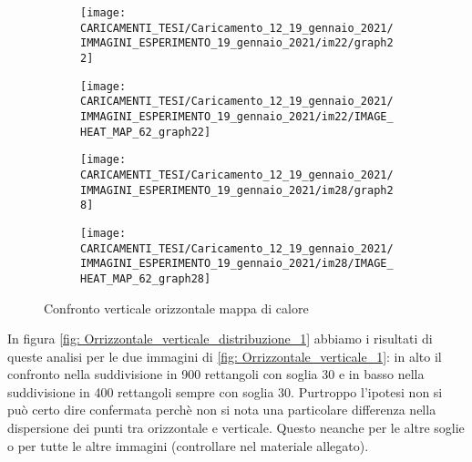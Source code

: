 \documentclass[%
	corpo=12pt,
    twoside,
    stile=classica,
    oldstyle,
    tipotesi=custom,
    greek,
    evenboxes,
]{toptesi}
\begin{document}
{%
%
%


\begin{figure}[!htb]\centering
\begin{subfigure}
\centering
\texttt{[image: CARICAMENTI\_TESI/Caricamento\_12\_19\_gennaio\_2021/IMMAGINI\_ESPERIMENTO\_19\_gennaio\_2021/im22/graph22]}
\end{subfigure}
\begin{subfigure}
\centering
\texttt{[image: CARICAMENTI\_TESI/Caricamento\_12\_19\_gennaio\_2021/IMMAGINI\_ESPERIMENTO\_19\_gennaio\_2021/im22/IMAGE\_HEAT\_MAP\_62\_graph22]}
\end{subfigure}
\begin{subfigure}
\centering
\texttt{[image: CARICAMENTI\_TESI/Caricamento\_12\_19\_gennaio\_2021/IMMAGINI\_ESPERIMENTO\_19\_gennaio\_2021/im28/graph28]}
\end{subfigure}
\begin{subfigure}
\centering
\texttt{[image: CARICAMENTI\_TESI/Caricamento\_12\_19\_gennaio\_2021/IMMAGINI\_ESPERIMENTO\_19\_gennaio\_2021/im28/IMAGE\_HEAT\_MAP\_62\_graph28]}
\end{subfigure}
\caption{Confronto verticale orizzontale mappa di calore}\label{fig: Orrizzontale_verticale_2}
\end{figure}

In figura \ref{fig: Orrizzontale_verticale_distribuzione_1} abbiamo i risultati di queste analisi per le due immagini di \ref{fig: Orrizzontale_verticale_1}: in alto il confronto nella suddivisione in 900 rettangoli con soglia 30 e in basso nella suddivisione in 400 rettangoli sempre con soglia 30. Purtroppo l'ipotesi non si può certo dire confermata perchè non si nota una particolare differenza nella dispersione dei punti tra orizzontale e verticale. Questo neanche per le altre soglie o per tutte le altre immagini (controllare nel materiale allegato). 

}
\end{document}
